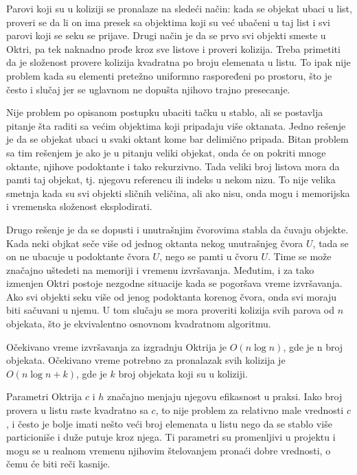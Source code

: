\documentclass[12pt,oneside]{memoir}
\begin{document}
Parovi koji su u koliziji se pronalaze na sledeći način:
kada se objekat ubaci u list, proveri se da li on ima presek sa objektima koji su već
ubačeni u taj list i svi parovi koji se seku se prijave.
Drugi način je da se prvo svi objekti smeste u Oktri, pa tek naknadno prođe kroz sve listove 
i proveri kolizija. 
Treba primetiti da je složenost provere kolizija kvadratna po broju elemenata u listu.
To ipak nije problem kada su elementi pretežno uniformno raspoređeni po prostoru, što je često 
i slučaj jer se uglavnom ne dopušta njihovo trajno presecanje. 

Nije problem po opisanom postupku ubaciti tačku u stablo, ali se postavlja pitanje šta raditi sa većim objektima
koji pripadaju više oktanata.
Jedno rešenje je da se objekat ubaci u svaki oktant kome bar delimično pripada. 
Bitan problem sa tim rešenjem je ako je u pitanju veliki objekat, onda će on pokriti mnoge oktante, njihove 
podoktante i tako rekurzivno. Tada veliki broj listova mora da pamti taj objekat, tj. njegovu referencu ili indeks u nekom nizu.
To nije velika smetnja kada su svi objekti sličnih veličina, ali ako 
nisu, onda mogu i memorijska i vremenska složenost eksplodirati. 

Drugo rešenje je da se dopusti i unutrašnjim čvorovima stabla da čuvaju objekte.
Kada neki objkat seče više od jednog oktanta nekog unutrašnjeg čvora $U$, tada se on ne ubacuje 
u podoktante čvora $U$, nego se pamti u čvoru $U$. Time se može značajno uštedeti na memoriji i vremenu izvršavanja.
Međutim, i za tako izmenjen Oktri postoje nezgodne situacije kada se pogoršava vreme izvršavanja.
Ako svi objekti seku više od jenog podoktanta korenog čvora, onda svi moraju biti sačuvani u njemu. 
U tom slučaju se mora proveriti kolizija svih parova od $n$ objekata, što je ekvivalentno osnovnom kvadratnom algoritmu.

Očekivano vreme izvršavanja za izgradnju Oktrija je $O(n \log n)$, gde je n broj objekata.
Očekivano vreme potrebno za pronalazak svih kolizija je $O(n \log n + k)$, gde je $k$ broj objekata koji su u koliziji.

Parametri Oktrija $c$ i $h$ značajno menjaju njegovu efikasnost u praksi. 
Iako broj provera u listu raste kvadratno sa $c$, to nije problem za relativno male vrednosti $c$, i često je bolje 
imati nešto veći broj elemenata u listu nego da se stablo više particioniše i duže putuje kroz njega.
Ti parametri su promenljivi u projektu i mogu se u realnom vremenu njihovim štelovanjem pronaći 
dobre vrednosti, o čemu će biti reči kasnije.
\end{document}
